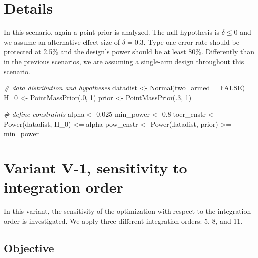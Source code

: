 \documentclass[
]{book}
\newenvironment{Shaded}{\begin{snugshade}}{\end{snugshade}}
\newcommand{\AttributeTok}[1]{\textcolor[rgb]{0.77,0.63,0.00}{#1}}
\newcommand{\CommentTok}[1]{\textcolor[rgb]{0.56,0.35,0.01}{\textit{#1}}}
\newcommand{\ConstantTok}[1]{\textcolor[rgb]{0.00,0.00,0.00}{#1}}
\newcommand{\DecValTok}[1]{\textcolor[rgb]{0.00,0.00,0.81}{#1}}
\newcommand{\FloatTok}[1]{\textcolor[rgb]{0.00,0.00,0.81}{#1}}
\newcommand{\FunctionTok}[1]{\textcolor[rgb]{0.00,0.00,0.00}{#1}}
\newcommand{\NormalTok}[1]{#1}
\newcommand{\OtherTok}[1]{\textcolor[rgb]{0.56,0.35,0.01}{#1}}
\newcommand{\SpecialCharTok}[1]{\textcolor[rgb]{0.00,0.00,0.00}{#1}}
\begin{document}
\hypertarget{details-4}{%
\section{Details}\label{details-4}}

In this scenario, again a point prior is analyzed.
The null hypothesis is \(\delta \leq 0\) and we assume an alternative effect size
of \(\delta = 0.3\).
Type one error rate should be protected at 2.5\% and the design's power should
be at least 80\%.
Differently than in the previous scenarios, we are assuming a single-arm
design throughout this scenario.

\begin{Shaded}
\begin{Highlighting}[]
\CommentTok{\# data distribution and hypotheses}
\NormalTok{datadist   }\OtherTok{\textless{}{-}} \FunctionTok{Normal}\NormalTok{(}\AttributeTok{two\_armed =} \ConstantTok{FALSE}\NormalTok{)}
\NormalTok{H\_0        }\OtherTok{\textless{}{-}} \FunctionTok{PointMassPrior}\NormalTok{(.}\DecValTok{0}\NormalTok{, }\DecValTok{1}\NormalTok{)}
\NormalTok{prior      }\OtherTok{\textless{}{-}} \FunctionTok{PointMassPrior}\NormalTok{(.}\DecValTok{3}\NormalTok{, }\DecValTok{1}\NormalTok{)}

\CommentTok{\# define constraints}
\NormalTok{alpha      }\OtherTok{\textless{}{-}} \FloatTok{0.025}
\NormalTok{min\_power  }\OtherTok{\textless{}{-}} \FloatTok{0.8}
\NormalTok{toer\_cnstr }\OtherTok{\textless{}{-}} \FunctionTok{Power}\NormalTok{(datadist, H\_0)   }\SpecialCharTok{\textless{}=}\NormalTok{ alpha}
\NormalTok{pow\_cnstr  }\OtherTok{\textless{}{-}} \FunctionTok{Power}\NormalTok{(datadist, prior) }\SpecialCharTok{\textgreater{}=}\NormalTok{ min\_power}
\end{Highlighting}
\end{Shaded}

\hypertarget{variantV_1}{%
\section{Variant V-1, sensitivity to integration order}\label{variantV_1}}

In this variant, the sensitivity of the optimization with respect to the
integration order is investigated.
We apply three different integration orders: 5, 8, and 11.

\hypertarget{objective-10}{%
\subsection{Objective}\label{objective-10}}
\end{document}
